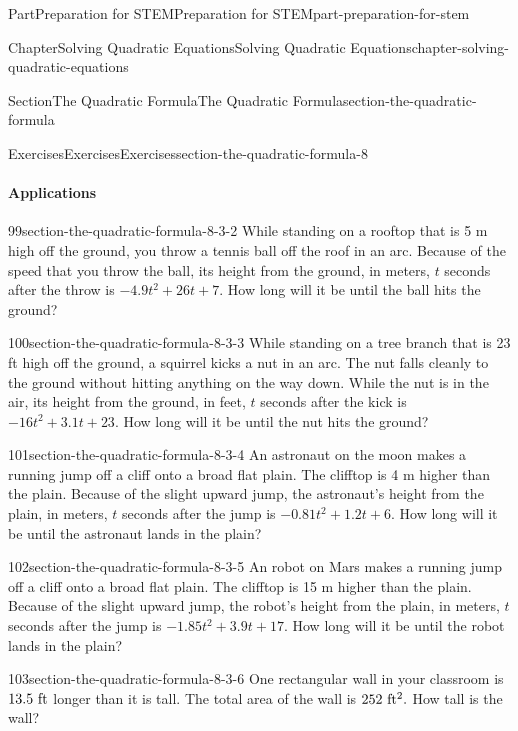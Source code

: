 \documentclass[twoside,10pt,]{book}
\numberwithin{equation}{section}
\begin{document}
\begin{partptx}{Part}{Preparation for STEM}{}{Preparation for STEM}{}{}{part-preparation-for-stem}
\begin{chapterptx}{Chapter}{Solving Quadratic Equations}{}{Solving Quadratic Equations}{}{}{chapter-solving-quadratic-equations}
\begin{sectionptx}{Section}{The Quadratic Formula}{}{The Quadratic Formula}{}{}{section-the-quadratic-formula}
\begin{exercises-subsection}{Exercises}{Exercises}{}{Exercises}{}{}{section-the-quadratic-formula-8}
\paragraph{Applications}\hypertarget{section-the-quadratic-formula-8-3}{}
\begin{divisionexercise}{99}{}{}{section-the-quadratic-formula-8-3-2}%
While standing on a rooftop that is 5 m high off the ground, you throw a tennis ball off the roof in an arc. Because of the speed that you throw the ball, its height from the ground, in meters, \(t\) seconds after the throw is \({-4.9t^{2}+26t+7}\text{.}\) How long will it be until the ball hits the ground?%
\end{divisionexercise}%
\begin{divisionexercise}{100}{}{}{section-the-quadratic-formula-8-3-3}%
While standing on a tree branch that is 23 ft high off the ground, a squirrel kicks a nut in an arc. The nut falls cleanly to the ground without hitting anything on the way down. While the nut is in the air, its height from the ground, in feet, \(t\) seconds after the kick is \({-16t^{2}+3.1t+23}\text{.}\) How long will it be until the nut hits the ground?%
\end{divisionexercise}%
\begin{divisionexercise}{101}{}{}{section-the-quadratic-formula-8-3-4}%
An astronaut on the moon makes a running jump off a cliff onto a broad flat plain. The clifftop is 4 m higher than the plain. Because of the slight upward jump, the astronaut's height from the plain, in meters, \(t\) seconds after the jump is \({-0.81t^{2}+1.2t+6}\text{.}\) How long will it be until the astronaut lands in the plain?%
\end{divisionexercise}%
\begin{divisionexercise}{102}{}{}{section-the-quadratic-formula-8-3-5}%
An robot on Mars makes a running jump off a cliff onto a broad flat plain. The clifftop is 15 m higher than the plain. Because of the slight upward jump, the robot's height from the plain, in meters, \(t\) seconds after the jump is \({-1.85t^{2}+3.9t+17}\text{.}\) How long will it be until the robot lands in the plain?%
\end{divisionexercise}%
\begin{divisionexercise}{103}{}{}{section-the-quadratic-formula-8-3-6}%
One rectangular wall in your classroom is \({13.5\ {\rm ft}}\) longer than it is tall. The total area of the wall is \({252\ {\rm ft^{2}}}\text{.}\) How tall is the wall?%
\end{divisionexercise}%

\end{exercises-subsection}
\end{sectionptx}
\end{chapterptx}
\end{partptx}
\end{document}
